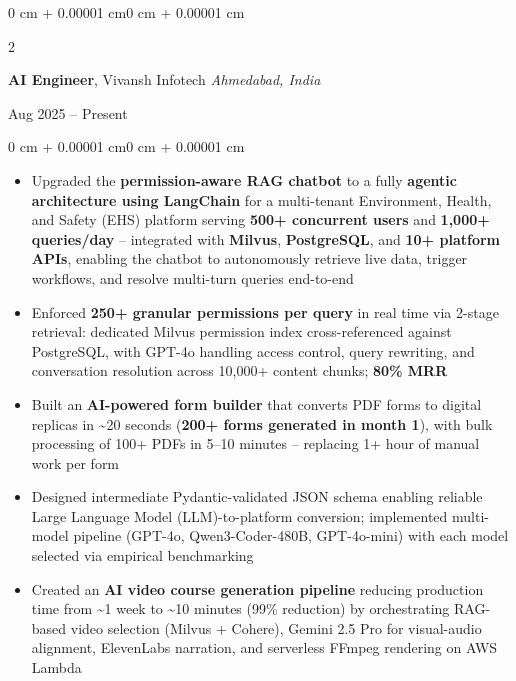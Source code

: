 \documentclass[10pt, letterpaper]{article}
\newenvironment{highlights}{
    \begin{itemize}[
        topsep=0.10 cm,
        parsep=0.10 cm,
        partopsep=0pt,
        itemsep=0pt,
        leftmargin=0 cm + 10pt
    ]
}{
    \end{itemize}
}
\newenvironment{onecolentry}{
    \begin{adjustwidth}{0 cm + 0.00001 cm}{0 cm + 0.00001 cm}
}{
    \end{adjustwidth}
}
\newenvironment{twocolentry}[2][]{
    \onecolentry
    \def\secondColumn{#2}
    \setcolumnwidth{\fill, 5.5 cm}
    \begin{paracol}{2}
}{
    \switchcolumn \raggedleft \secondColumn
    \end{paracol}
    \endonecolentry
}
\begin{document}
        \begin{twocolentry}{
            Aug 2025 -- Present
        }
            \textbf{AI Engineer}, Vivansh Infotech \hfill \textit{Ahmedabad, India}
        \end{twocolentry}

        \vspace{0.10 cm}
        \begin{onecolentry}
            \begin{highlights}
                \item Upgraded the \textbf{permission-aware RAG chatbot} to a fully \textbf{agentic architecture using LangChain} for a multi-tenant Environment, Health, and Safety (EHS) platform serving \textbf{500+ concurrent users} and \textbf{1,000+ queries/day} -- integrated with \textbf{Milvus}, \textbf{PostgreSQL}, and \textbf{10+ platform APIs}, enabling the chatbot to autonomously retrieve live data, trigger workflows, and resolve multi-turn queries end-to-end
                \item Enforced \textbf{250+ granular permissions per query} in real time via 2-stage retrieval: dedicated Milvus permission index cross-referenced against PostgreSQL, with GPT-4o handling access control, query rewriting, and conversation resolution across 10,000+ content chunks; \textbf{80\% MRR}
                \item Built an \textbf{AI-powered form builder} that converts PDF forms to digital replicas in \textasciitilde20 seconds (\textbf{200+ forms generated in month 1}), with bulk processing of 100+ PDFs in 5--10 minutes -- replacing 1+ hour of manual work per form
                \item Designed intermediate Pydantic-validated JSON schema enabling reliable Large Language Model (LLM)-to-platform conversion; implemented multi-model pipeline (GPT-4o, Qwen3-Coder-480B, GPT-4o-mini) with each model selected via empirical benchmarking
                \item Created an \textbf{AI video course generation pipeline} reducing production time from \textasciitilde1 week to \textasciitilde10 minutes (99\% reduction) by orchestrating RAG-based video selection (Milvus + Cohere), Gemini 2.5 Pro for visual-audio alignment, ElevenLabs narration, and serverless FFmpeg rendering on AWS Lambda
            \end{highlights}
        \end{onecolentry}

        \vspace{0.2 cm}
\end{document}
